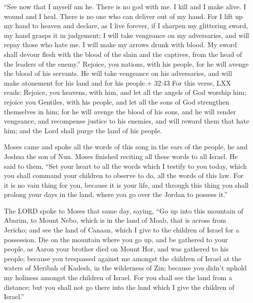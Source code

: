 ``See now that I myself am he. There is no god with me. I kill and I
make alive. I wound and I heal. There is no one who can deliver out of
my hand.  For I lift up my hand to heaven and declare, as I
live forever,  if I sharpen my glittering sword, my hand
grasps it in judgement; I will take vengeance on my adversaries, and
will repay those who hate me.  I will make my arrows drunk
with blood. My sword shall devour flesh with the blood of the slain and
the captives, from the head of the leaders of the enemy.'' 
Rejoice, you nations, with his people, for he will avenge the blood of
his servants. He will take vengeance on his adversaries, and will make
atonement for his land and for his people.+ 32:43 For this verse, LXX
reads: Rejoice, you heavens, with him, and let all the angels of God
worship him; rejoice you Gentiles, with his people, and let all the sons
of God strengthen themselves in him; for he will avenge the blood of his
sons, and he will render vengeance, and recompense justice to his
enemies, and will reward them that hate him; and the Lord shall purge
the land of his people.

 Moses came and spoke all the words of this song in the
ears of the people, he and Joshua the son of Nun.  Moses
finished reciting all these words to all Israel.  He said
to them, ``Set your heart to all the words which I testify to you today,
which you shall command your children to observe to do, all the words of
this law.  For it is no vain thing for you, because it is
your life, and through this thing you shall prolong your days in the
land, where you go over the Jordan to possess it.''

 The LORD spoke to Moses that same day, saying,
 ``Go up into this mountain of Abarim, to Mount Nebo, which
is in the land of Moab, that is across from Jericho; and see the land of
Canaan, which I give to the children of Israel for a possession.
 Die on the mountain where you go up, and be gathered to
your people, as Aaron your brother died on Mount Hor, and was gathered
to his people;  because you trespassed against me amongst
the children of Israel at the waters of Meribah of Kadesh, in the
wilderness of Zin; because you didn't uphold my holiness amongst the
children of Israel.  For you shall see the land from a
distance; but you shall not go there into the land which I give the
children of Israel.''


